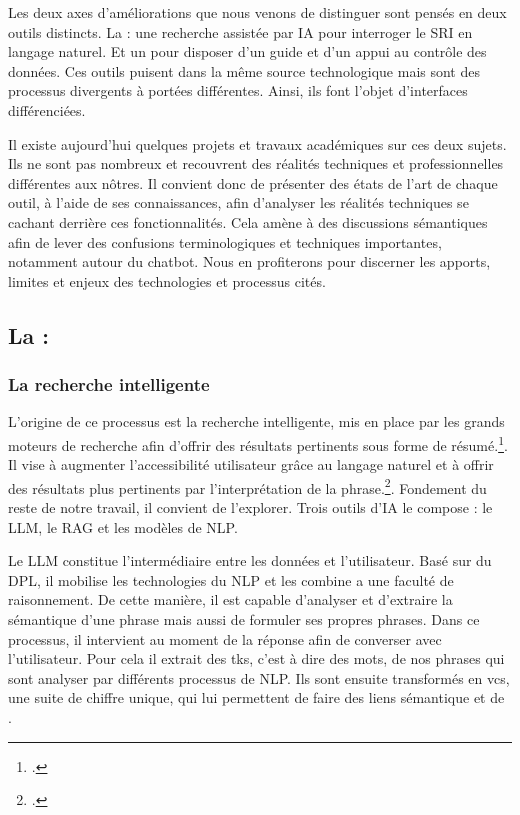 
Les deux axes d'améliorations que nous venons de distinguer sont pensés en deux outils distincts. La  : une recherche assistée par \gls{IA} pour interroger le \gls{SRI} en langage naturel. Et un  pour disposer d'un guide et d'un appui au contrôle des données. Ces outils puisent dans la même source technologique mais sont des processus divergents à portées différentes. Ainsi, ils font l'objet d'interfaces différenciées.

Il existe aujourd'hui quelques projets et travaux académiques sur ces deux sujets. Ils ne sont pas nombreux et recouvrent des réalités techniques et professionnelles différentes aux nôtres. Il convient donc de présenter des états de l'art de chaque outil, à l'aide de ses connaissances, afin d'analyser les réalités techniques se cachant derrière ces fonctionnalités. Cela amène à des discussions sémantiques afin de lever des confusions terminologiques et techniques importantes, notamment autour du \gls{chatbot}. Nous en profiterons pour discerner les apports, limites et enjeux des technologies et processus cités.

\subsection{La  : }

\subsubsection{La recherche intelligente}


L'origine de ce processus est la recherche intelligente, mis en place par les grands moteurs de recherche afin d'offrir des résultats pertinents sous forme de résumé.\footcite{flamentGoogleSGEAI2025}. Il vise à augmenter l'accessibilité utilisateur grâce au langage naturel et à offrir des résultats plus pertinents par l'interprétation de la phrase.\footcite{flamentGoogleSGEAI2025}. Fondement du reste de notre travail, il convient de l'explorer. Trois outils d'\gls{IA} le compose : le \gls{LLM}, le \gls{RAG} et les modèles de \gls{NLP}.\newline

Le \gls{LLM} constitue l'intermédiaire entre les données et l'utilisateur. Basé sur du \gls{DPL}, il mobilise les technologies du \gls{NLP} et les combine a une faculté de raisonnement. De cette manière, il est capable d'analyser et d'extraire la sémantique d'une phrase mais aussi de formuler ses propres phrases. Dans ce processus, il intervient au moment de la réponse afin de converser avec l'utilisateur. 
Pour cela il extrait des \glspl{tk}, c'est à dire des mots, de nos phrases qui sont analyser par différents processus de \gls{NLP}. Ils sont ensuite transformés en \gls{vcs}, une suite de chiffre unique, qui lui permettent de faire des liens sémantique et de .

